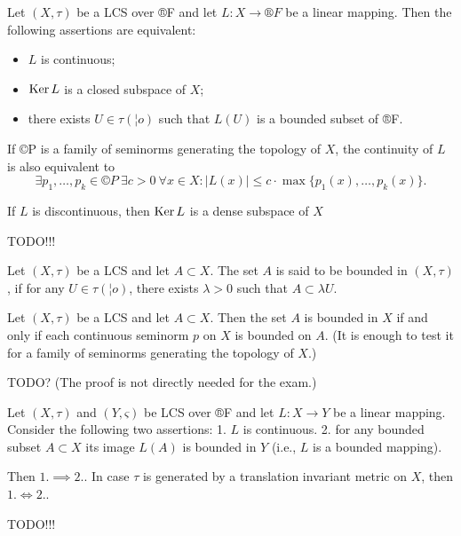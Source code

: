 \documentclass[12pt]{article}					%
\begin{document}
\begin{tvrzeni}
	Let $(X, τ)$ be a LCS over ®F and let $L: X \rightarrow ®F$ be a linear mapping. Then the following assertions are equivalent:
	\begin{itemize}
		\item $L$ is continuous;
		\item $\operatorname{Ker} L$ is a closed subspace of $X$;
		\item there exists $U \in τ(¦o)$ such that $L(U)$ is a bounded subset of ®F.
	\end{itemize}

	If ©P is a family of seminorms generating the topology of $X$, the continuity of $L$ is also equivalent to
	$$ \exists p_1, …, p_k \in ©P\ \exists c > 0\ \forall x \in X: |L(x)| ≤ c·\max\{p_1(x), …, p_k(x)\}. $$

	If $L$ is discontinuous, then $\operatorname{Ker} L$ is a dense subspace of $X$

	\begin{dukazin}
		TODO!!!
	\end{dukazin}
\end{tvrzeni}

\begin{definice}
	Let $(X, τ)$ be a LCS and let $A \subset X$. The set $A$ is said to be bounded in $(X, τ)$, if for any $U \in τ(¦o)$, there exists $λ > 0$ such that $A \subset λ U$.
\end{definice}

\begin{lemma}
	Let $(X, τ)$ be a LCS and let $A \subset X$. Then the set $A$ is bounded in $X$ if and only if each continuous seminorm $p$ on $X$ is bounded on $A$. (It is enough to test it for a family of seminorms generating the topology of $X$.)

	\begin{dukazin}
		TODO? (The proof is not directly needed for the exam.)
	\end{dukazin}
\end{lemma}

\begin{tvrzeni}
	Let $(X, τ)$ and $(Y, ς)$ be LCS over ®F and let $L: X \rightarrow Y$ be a linear mapping. Consider the following two assertions: 1. $L$ is continuous. 2. for any bounded subset $A \subset X$ its image $L(A)$ is bounded in $Y$ (i.e., $L$ is a bounded mapping).

	Then $1. \implies 2.$. In case $τ$ is generated by a translation invariant metric on $X$, then $1. \Leftrightarrow 2.$.

	\begin{dukazin}
		TODO!!!
	\end{dukazin}
\end{tvrzeni}
\end{document}
